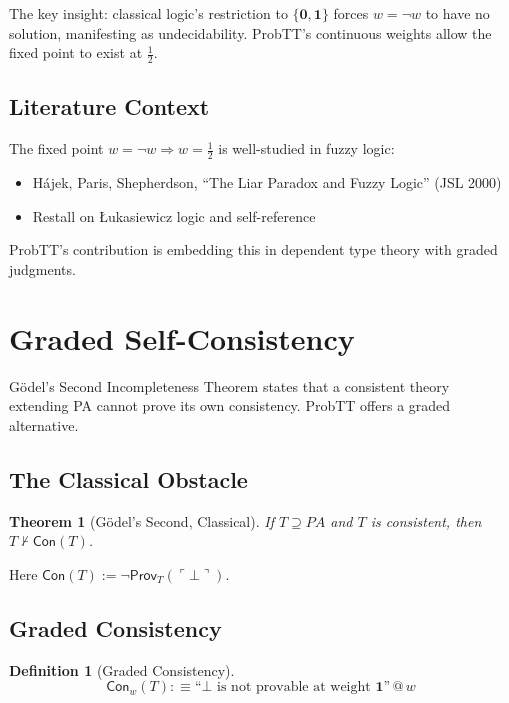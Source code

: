 \documentclass[11pt,a4paper]{article}
\makeatletter
\newtheorem{definition}{Definition}[section]
\newtheorem{theorem}{Theorem}[section]
\newcommand{\at}[1]{\,@\,#1}
\newcommand{\one}{\mathbf{1}}
\newcommand{\zero}{\mathbf{0}}
\newcommand{\negw}{\neg}
\makeatother
\begin{document}
The key insight: classical logic's restriction to $\{\zero, \one\}$ forces $w = \negw w$ to have no solution, manifesting as undecidability. ProbTT's continuous weights allow the fixed point to exist at $\frac{1}{2}$.

\subsection{Literature Context}

The fixed point $w = \negw w \Rightarrow w = \frac{1}{2}$ is well-studied in fuzzy logic:

\begin{itemize}
    \item Hájek, Paris, Shepherdson, ``The Liar Paradox and Fuzzy Logic'' (JSL 2000) \citep{hajek2000liar}
    \item Restall on Łukasiewicz logic and self-reference
\end{itemize}

ProbTT's contribution is embedding this in dependent type theory with graded judgments.

\section{Graded Self-Consistency}

G\"odel's Second Incompleteness Theorem states that a consistent theory extending PA cannot prove its own consistency. ProbTT offers a graded alternative.

\subsection{The Classical Obstacle}

\begin{theorem}[G\"odel's Second, Classical]
If $T \supseteq PA$ and $T$ is consistent, then $T \not\vdash \mathsf{Con}(T)$.
\end{theorem}

Here $\mathsf{Con}(T) := \neg\mathsf{Prov}_T(\ulcorner \bot \urcorner)$.

\subsection{Graded Consistency}

\begin{definition}[Graded Consistency]
\[
\mathsf{Con}_w(T) :\equiv \text{``$\bot$ is not provable at weight $\one$''} \at{w}
\]
\end{definition}
\end{document}
